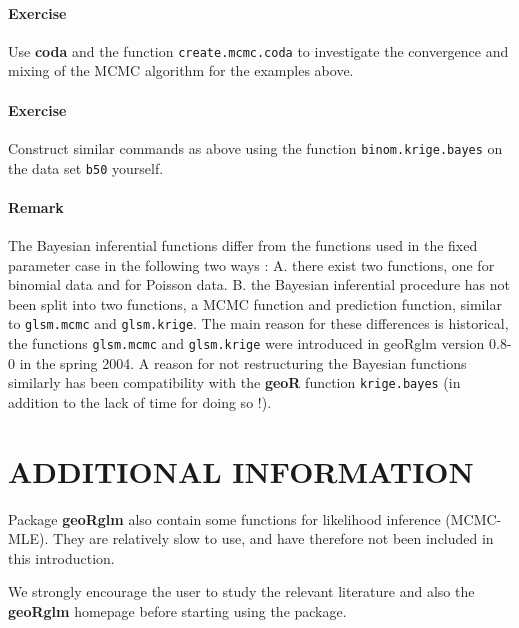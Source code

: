 \documentclass[12pt,a4paper]{article}
\newcommand{\strong}[1]{{\textbf{ #1}}}
\let\pkg=\strong
\newcommand{\code}[1]{\texttt{\small #1}}
\let\command=\code
\begin{document}
\paragraph*{Exercise}	
Use \pkg{coda} and the function \code{create.mcmc.coda} to investigate
the convergence and mixing of the MCMC algorithm for the examples above. 


\paragraph*{Exercise}
Construct similar commands as above using the function \command{binom.krige.bayes} on the data set \code{b50} yourself. 


\paragraph*{Remark}
The Bayesian inferential functions differ from the functions used in
the fixed parameter case in the following two ways : A. there exist two
functions, one for binomial data and for Poisson data. B. the Bayesian inferential procedure has not been
split into two functions, a MCMC function and prediction function,
similar to \code{glsm.mcmc} and \code{glsm.krige}. The main reason for
these differences is historical, the functions \code{glsm.mcmc} and
\code{glsm.krige} were introduced in geoRglm version 0.8-0 in the
spring 2004. A reason for not restructuring the Bayesian functions
similarly has been compatibility with the \pkg{geoR}
function \code{krige.bayes} (in addition to the lack of
time for doing so !).


\section{ADDITIONAL INFORMATION }  

Package \pkg{geoRglm} also contain some functions for likelihood inference
(MCMC-MLE). They are relatively slow to use, and have therefore not
been included in this introduction. 

We strongly encourage the user to study the relevant literature and
also the \pkg{geoRglm} homepage before starting using the package.
\end{document}
